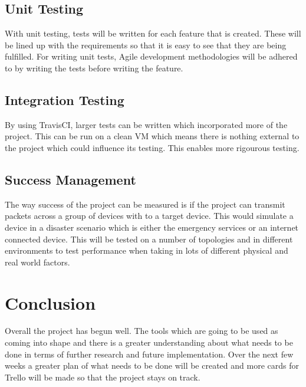 \documentclass{report}
\begin{document}
\section*{Unit Testing}

With unit testing, tests will be written for each feature that is created. These will be lined up with the requirements so that 
it is easy to see that they are being fulfilled. For writing unit tests, Agile development methodologies will be adhered to by 
writing the tests before writing the feature. 

\section*{Integration Testing}

By using TravisCI, larger tests can be written which incorporated more of the project. This can be run on a clean VM which 
means there is nothing external to the project which could influence its testing. This enables more rigourous testing. 

\section*{Success Management}

The way success of the project can be measured is if the project can transmit packets across a group of devices with to a 
target device. This would simulate a device in a disaster scenario which is either the emergency services or an internet 
connected device. This will be tested on a number of topologies and in different environments to test performance when taking 
in lots of different physical and real world factors.


\chapter*{Conclusion}

Overall the project has begun well. The tools which are going to be used as coming into shape and there is a greater 
understanding about what needs to be done in terms of further research and future implementation. Over the next few 
weeks a greater plan of what needs to be done will be created and more cards for Trello will be made so that the 
project stays on track.


{}

\end{document}
